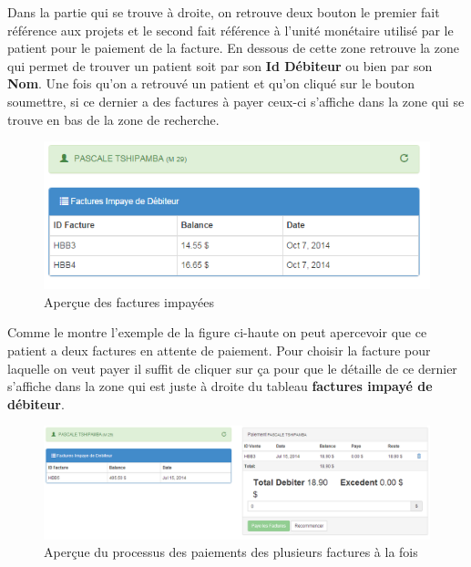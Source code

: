 \documentclass[12pt,a4paper]{report}
\begin{document}
Dans la partie qui se trouve à droite, on retrouve deux bouton le premier fait référence aux projets et le second fait référence à l'unité monétaire utilisé par le patient pour le paiement de la facture. En dessous de cette zone retrouve la zone qui permet de trouver un patient soit par son \textbf{Id Débiteur} ou bien par son \textbf{Nom}. 
Une fois qu'on a retrouvé un patient et qu'on cliqué sur le bouton soumettre, si ce dernier a des factures à payer ceux-ci s'affiche dans la zone qui se trouve en bas de la zone de recherche. 

\begin{figure}[h]
\begin{center}
\includegraphics[width=14cm]{pic/ViewInvoice.png}
\end{center}
\caption{Aperçue des factures impayées}
\label{Aperçue des factures impayées}
\end{figure}

Comme le montre l'exemple de la figure ci-haute on peut apercevoir que ce patient a deux factures en attente de paiement. Pour choisir la facture pour laquelle on veut payer il suffit de cliquer sur ça pour que le détaille de ce dernier s'affiche dans la zone qui est juste à droite du tableau \textbf{factures impayé de débiteur}.



\begin{figure}[h]
\begin{center}
\includegraphics[width=14cm]{pic/PaidInvoice.png}
\end{center}
\caption{Aperçue du processus des paiements des plusieurs factures à la fois}
\label{Aperçue du processus des paiements des plusieurs factures à la fois}
\end{figure}
\end{document}
